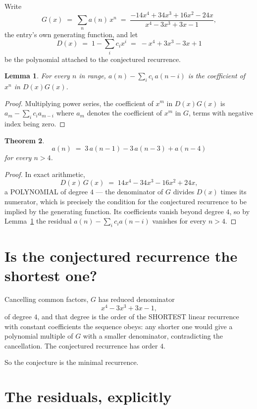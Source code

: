 \documentclass[11pt,a4paper]{article}
\theoremstyle{plain}
\newtheorem{theorem}{Theorem}
\newtheorem{lemma}[theorem]{Lemma}
\theoremstyle{definition}
\begin{document}
Write
\[
G(x)\;=\;\sum_{n}a(n)\,x^{n}\;=\;\frac{- 14 x^{4} + 34 x^{3} + 16 x^{2} - 24 x}{x^{4} - 3 x^{3} + 3 x - 1},
\]
the entry's own generating function, and let
\[
D(x)\;=\;1-\sum_i c_i x^{i}\;=\;- x^{4} + 3 x^{3} - 3 x + 1
\]
be the polynomial attached to the conjectured recurrence.

\begin{lemma}\label{lem:key}
For every $n$ in range, $a(n)-\sum_i c_i\,a(n-i)$ is the coefficient of $x^{n}$ in
$D(x)G(x)$.
\end{lemma}

\begin{proof}
Multiplying power series, the coefficient of $x^{m}$ in $D(x)G(x)$ is
$a_m-\sum_i c_i a_{m-i}$ where $a_m$ denotes the coefficient of $x^{m}$ in $G$, terms with
negative index being zero.
\end{proof}

\begin{theorem}
\[
a(n)\;=\;3\,a(n-1) - 3\,a(n-3) + a(n-4)
\]
for every $n>4$.
\end{theorem}

\begin{proof}
In exact arithmetic,
\[
D(x)\,G(x)\;=\;14 x^{4} - 34 x^{3} - 16 x^{2} + 24 x,
\]
a POLYNOMIAL of degree $4$ --- the denominator of $G$ divides $D(x)$ times its numerator,
which is precisely the condition for the conjectured recurrence to be implied by the
generating function. Its coefficients vanish beyond degree $4$, so by
Lemma~\ref{lem:key} the residual $a(n)-\sum_ic_ia(n-i)$ vanishes for every
$n>4$.
\end{proof}

\section{Is the conjectured recurrence the shortest one?}

Cancelling common factors, $G$ has reduced denominator
\[
x^{4} - 3 x^{3} + 3 x - 1,
\]
of degree $4$, and that degree is the order of the SHORTEST linear recurrence with
constant coefficients the sequence obeys: any shorter one would give a polynomial multiple of
$G$ with a smaller denominator, contradicting the cancellation. The conjectured recurrence has
order $4$.

So the conjecture is the minimal recurrence.

\section{The residuals, explicitly}
\end{document}
